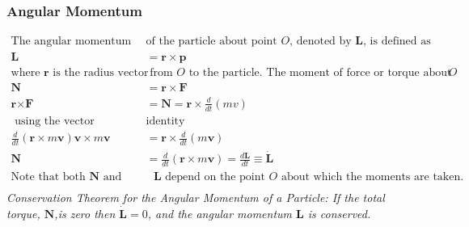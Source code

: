 \subsubsection{Angular Momentum}
\begin{align*}
\text{The angular momentum }&\text{of the particle about point $O$, denoted by $\textbf{L}$, is defined as}\\
\textbf{L}&=\textbf{r}\times\textbf{p}\\
\text{where $\textbf{r}$ is the radius vector}&\text{ from $O$ to the particle. The moment of force or torque about $O$}\\
\textbf{N}&=\textbf{r}\times\textbf{F}\\
\textbf{r}\times\textbf{F}&=\textbf{N}=\textbf{r}\times\frac{d}{dt}(mv)\\
\text{ using the vector }&\text{identity}\\
\frac{d}{dt}(\textbf{r}\times m\textbf{v})\textbf{v}\times m\textbf{v}&=\textbf{r}\times\frac{d}{dt}(m\textbf{v})\\
\textbf{N}&=\frac{d}{dt}(\textbf{r}\times m\textbf{v})=\frac{d\textbf{L}}{dt}\equiv \dot{\textbf{L}}\\
\text{Note that both $\textbf{N}$ and }&\text{ $\textbf{L}$ depend on the point $O$ about which the moments are taken.}\\
\end{align*}
\textit{Conservation Theorem for the Angular Momentum of a Particle: If the total torque, $\textbf{N}$,is zero then $\dot{\textbf{L}}=0$, and the angular momentum $\textbf{L}$ is conserved. }
